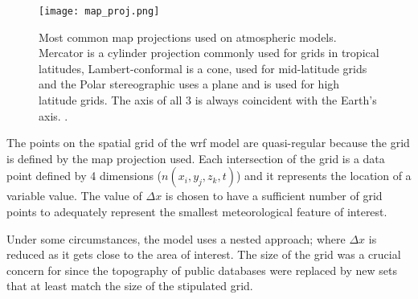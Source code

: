 \begin{figure}
    \centering
    \texttt{[image: map\_proj.png]}
    \caption{Most common map projections used on atmospheric models. Mercator is a cylinder projection commonly used for grids in tropical latitudes, Lambert-conformal is a cone, used for mid-latitude grids and the Polar stereographic uses a plane and is used for high latitude grids. The axis of all 3 is always coincident with the Earth's axis. \cite{warner2010numerical}.}
    \label{fig:map_projection}
\end{figure}


The points on the spatial grid of the \acrshort{wrf} model are quasi-regular because the grid is defined by the map projection %
used. Each intersection of the grid is a data point defined by 4 dimensions (\textit{$n(x_{i},y_{j},z_{k},t)$}) and it represents the location of a variable value. %
The value of $\Delta x$ is chosen to have a sufficient number of grid points to adequately represent the smallest meteorological feature of interest. \par

Under some circumstances, the model uses a nested approach; where $\Delta x$ is reduced as it gets close to the area of interest. The size of the grid was a crucial concern for \cite{giannaros2018ultrahigh} since the topography of public databases were replaced by new sets that at least match the size of the stipulated grid.\par

